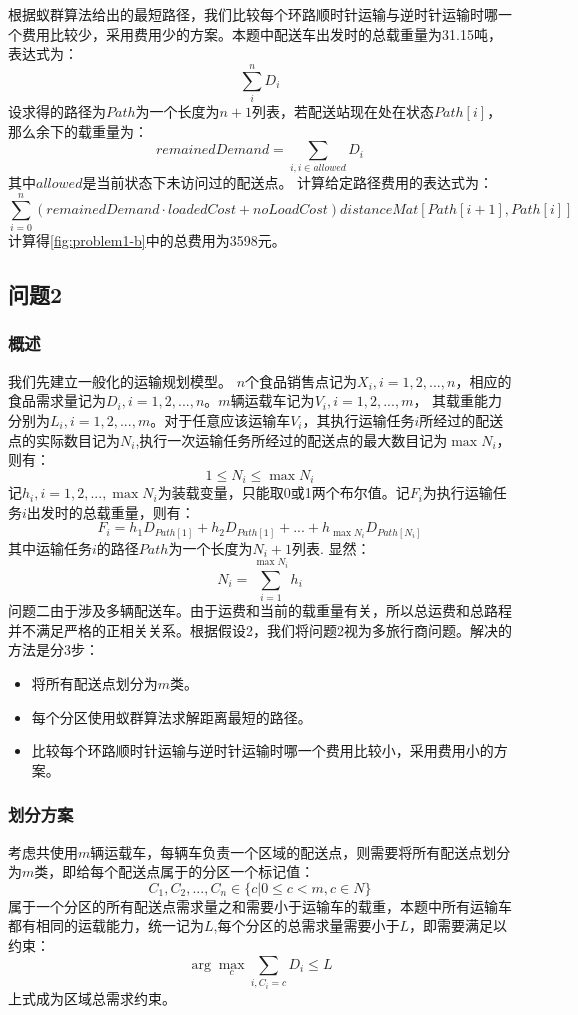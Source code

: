 \documentclass{cumcmthesis}
\begin{document}
    根据蚁群算法给出的最短路径，我们比较每个环路顺时针运输与逆时针运输时哪一个费用比较少，采用费用少的方案。本题中配送车出发时的总载重量为31.15吨，表达式为：
    $$\sum_{i}^{n} D_i$$
    设求得的路径为$Path$为一个长度为$n+1$列表，若配送站现在处在状态$Path[i]$，那么余下的载重量为：
    $$remainedDemand = \sum_{i,i\in allowed} D_i$$
    其中$allowed$是当前状态下未访问过的配送点。
    计算给定路径费用的表达式为：
    $$\sum_{i=0}^{n} (remainedDemand·loadedCost+noLoadCost)distanceMat[Path[i+1],Path[i]]$$
    计算得\cref{fig:problem1-b}中的总费用为3598元。

\subsection{问题2}
    \subsubsection{概述}
    我们先建立一般化的运输规划模型。
    $n$个食品销售点记为$X_i,i=1,2,...,n$，相应的食品需求量记为$D_{i},i=1,2,...,n$。$m$辆运载车记为$V_i,i=1,2,...,m$， 其载重能力分别为$L_i,i=1,2,...,m$。对于任意应该运输车$V_i$，其执行运输任务$i$所经过的配送点的实际数目记为$N_{i}$,执行一次运输任务所经过的配送点的最大数目记为$\max N_{i}$，则有：
    $$1\leq N_{i} \leq \max N_{i}$$
    记$h_i,i=1,2,...,\max N_{i}$为装载变量，只能取0或1两个布尔值。记$F_i$为执行运输任务$i$出发时的总载重量，则有：
    $$F_i=h_1 D_{Path[1]}+h_2 D_{Path[1]}+...+h_{\max N_{i}}D_{Path[N_{i}]}$$
    其中运输任务$i$的路径$Path$为一个长度为$N_{i}+1$列表.
    显然：
    $$N_i = \sum_{i=1}^{\max N_{i}} h_i$$
    问题二由于涉及多辆配送车。由于运费和当前的载重量有关，所以总运费和总路程并不满足严格的正相关关系。根据假设2，我们将问题2视为多旅行商问题。解决的方法是分3步：
    \begin{itemize}
        \item {将所有配送点划分为$m$类。}
        \item {每个分区使用蚁群算法求解距离最短的路径。}
        \item {比较每个环路顺时针运输与逆时针运输时哪一个费用比较小，采用费用小的方案。}
    \end{itemize}

    \subsubsection{划分方案}
    
    考虑共使用$m$辆运载车，每辆车负责一个区域的配送点，则需要将所有配送点划分为$m$类，即给每个配送点属于的分区一个标记值：
    $$C_1,C_2,...,C_n \in \{c | 0\leq c <m, c\in N\}$$
    属于一个分区的所有配送点需求量之和需要小于运输车的载重，本题中所有运输车都有相同的运载能力，统一记为$L$,每个分区的总需求量需要小于$L$，即需要满足以约束：
    $$\arg\max_{c}\sum_{i,C_i=c }{D_i} \leq L$$
    上式成为区域总需求约束。
    
\end{document}
